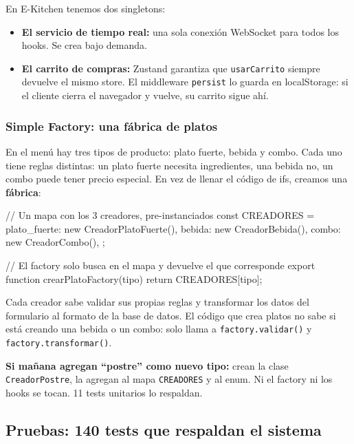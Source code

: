 \documentclass[12pt,a4paper]{article}
\begin{document}
En E-Kitchen tenemos dos singletons:
\begin{itemize}[itemsep=2pt]
  \item \textbf{El servicio de tiempo real:} una sola conexión WebSocket para todos los hooks. Se crea bajo demanda.
  \item \textbf{El carrito de compras:} Zustand garantiza que \texttt{usarCarrito} siempre devuelve el mismo store. El middleware \texttt{persist} lo guarda en localStorage: si el cliente cierra el navegador y vuelve, su carrito sigue ahí.
\end{itemize}

\subsubsection{Simple Factory: una fábrica de platos}

En el menú hay tres tipos de producto: plato fuerte, bebida y combo. Cada uno tiene reglas distintas: un plato fuerte necesita ingredientes, una bebida no, un combo puede tener precio especial. En vez de llenar el código de ifs, creamos una \textbf{fábrica}:

\begin{codeblock}
// Un mapa con los 3 creadores, pre-instanciados
const CREADORES = {
  plato_fuerte: new CreadorPlatoFuerte(),
  bebida:        new CreadorBebida(),
  combo:         new CreadorCombo(),
};

// El factory solo busca en el mapa y devuelve el que corresponde
export function crearPlatoFactory(tipo) {
  return CREADORES[tipo];
}
\end{codeblock}

Cada creador sabe validar sus propias reglas y transformar los datos del formulario al formato de la base de datos. El código que crea platos no sabe si está creando una bebida o un combo: solo llama a \texttt{factory.validar()} y \texttt{factory.transformar()}.

\begin{tipbox}
\textbf{Si mañana agregan ``postre'' como nuevo tipo:} crean la clase \texttt{CreadorPostre}, la agregan al mapa \texttt{CREADORES} y al enum. Ni el factory ni los hooks se tocan. 11 tests unitarios lo respaldan.
\end{tipbox}

\subsection{Pruebas: 140 tests que respaldan el sistema}
\end{document}
